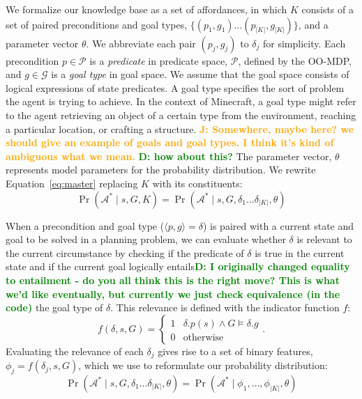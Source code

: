 \documentclass[conference]{IEEEtran}
\newcommand{\dnote}[1]{\textcolor{Green}{\textbf{D: #1}}}
\newcommand{\jnote}[1]{\textcolor{Orange}{\textbf{J: #1}}}
\begin{document}
We formalize our knowledge base as a set of affordances, in which $K$
consists of a set of paired preconditions and goal types, $\{ (p_1, g_1) 
\ldots (p_{|K|}, g_{|K|}) \}$, and a parameter vector $\theta$.  We abbreviate
each pair $(p_j, g_j)$ to $\delta_j$ for simplicity. Each precondition $p \in \mathcal{P}$
is a {\it predicate} in predicate space, $\mathcal{P}$, defined by the OO-MDP, and $g \in \mathcal{G}$ is a {\it goal type} in goal space. We assume that the goal space consists of logical expressions of state predicates.
A goal type specifies the sort of problem the agent is trying to achieve. In the context of Minecraft,
a goal type might refer to the agent retrieving an object of a certain type from the environment, reaching a particular location, or crafting a structure. \jnote{Somewhere, maybe here? we should give an example of goals and goal types.
I think it's kind of ambiguous what we mean.} \dnote{how about this?}
The parameter vector, $\theta$ represents model parameters for the probability distribution.
We rewrite Equation~\ref{eq:master} replacing $K$ with its constituents:
\begin{equation}
\Pr(\mathcal{A}^* \mid s, G, K) = \Pr(\mathcal{A}^* \mid s, G, \delta_1 \ldots \delta_{|K|}, \theta)
\end{equation}

When a precondition and goal type ($\langle p , g \rangle = \delta$) is paired with a current state and goal to be solved in a planning problem, we can evaluate whether $\delta$ is relevant to the current circumstance by checking if the predicate of $\delta$ is true in the current state and if the current goal logically entails\dnote{I originally changed equality to entailment - do you all think this is the right move? This is what we'd like eventually, but currently we just check equivalence (in the code)} the goal type of $\delta$. This relevance is defined with the indicator function $f$:
\begin{equation}
f(\delta, s, G) = 
\begin{cases}
1& \delta.p(s) \wedge G \models \delta.g \\
0& \text{otherwise}
\end{cases}.
\label{eq:f_func_def}
\end{equation}
Evaluating the relevance of each $\delta_j$ gives rise to a set of binary features, $\phi_j = f(\delta_j, s, G)$, which we use to reformulate our probability distribution:
\begin{equation}
\Pr(\mathcal{A}^* \mid s, G, \delta_1 \ldots \delta_{|K|}, \theta) = \Pr(\mathcal{A}^* \mid \phi_1, \ldots, \phi_{|K|}, \theta)
\label{eq:feature_rep}
\end{equation}
\end{document}
